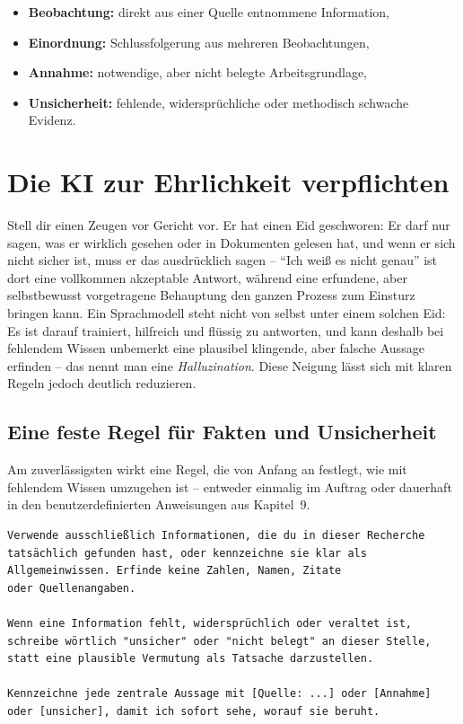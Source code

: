 \begin{itemize}
\item \textbf{Beobachtung:} direkt aus einer Quelle entnommene Information,
\item \textbf{Einordnung:} Schlussfolgerung aus mehreren Beobachtungen,
\item \textbf{Annahme:} notwendige, aber nicht belegte Arbeitsgrundlage,
\item \textbf{Unsicherheit:} fehlende, widersprüchliche oder methodisch schwache Evidenz.
\end{itemize}

\section{Die KI zur Ehrlichkeit verpflichten}

Stell dir einen Zeugen vor Gericht vor. Er hat einen Eid geschworen: Er darf nur sagen, was er wirklich gesehen oder in Dokumenten gelesen hat, und wenn er sich nicht sicher ist, muss er das ausdrücklich sagen -- ``Ich weiß es nicht genau'' ist dort eine vollkommen akzeptable Antwort, während eine erfundene, aber selbstbewusst vorgetragene Behauptung den ganzen Prozess zum Einsturz bringen kann. Ein Sprachmodell steht nicht von selbst unter einem solchen Eid: Es ist darauf trainiert, hilfreich und flüssig zu antworten, und kann deshalb bei fehlendem Wissen unbemerkt eine plausibel klingende, aber falsche Aussage erfinden -- das nennt man eine \emph{Halluzination}. Diese Neigung lässt sich mit klaren Regeln jedoch deutlich reduzieren.

\subsection{Eine feste Regel für Fakten und Unsicherheit}

Am zuverlässigsten wirkt eine Regel, die von Anfang an festlegt, wie mit fehlendem Wissen umzugehen ist -- entweder einmalig im Auftrag oder dauerhaft in den benutzerdefinierten Anweisungen aus Kapitel~9.

\begin{lstlisting}
Verwende ausschließlich Informationen, die du in dieser Recherche
tatsächlich gefunden hast, oder kennzeichne sie klar als 
Allgemeinwissen. Erfinde keine Zahlen, Namen, Zitate 
oder Quellenangaben.

Wenn eine Information fehlt, widersprüchlich oder veraltet ist,
schreibe wörtlich "unsicher" oder "nicht belegt" an dieser Stelle,
statt eine plausible Vermutung als Tatsache darzustellen.

Kennzeichne jede zentrale Aussage mit [Quelle: ...] oder [Annahme]
oder [unsicher], damit ich sofort sehe, worauf sie beruht.
\end{lstlisting}

